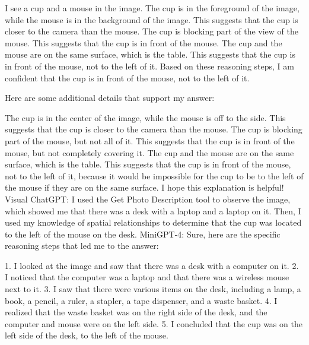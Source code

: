 \begin{enumerate}
    I see a cup and a mouse in the image.
    The cup is in the foreground of the image, while the mouse is in the background of the image. This suggests that the cup is closer to the camera than the mouse.
    The cup is blocking part of the view of the mouse. This suggests that the cup is in front of the mouse.
    The cup and the mouse are on the same surface, which is the table. This suggests that the cup is in front of the mouse, not to the left of it.
    Based on these reasoning steps, I am confident that the cup is in front of the mouse, not to the left of it.

    Here are some additional details that support my answer:

    The cup is in the center of the image, while the mouse is off to the side. This suggests that the cup is closer to the camera than the mouse.
    The cup is blocking part of the mouse, but not all of it. This suggests that the cup is in front of the mouse, but not completely covering it.
    The cup and the mouse are on the same surface, which is the table. This suggests that the cup is in front of the mouse, not to the left of it, because it would be impossible for the cup to be to the left of the mouse if they are on the same surface.
    I hope this explanation is helpful!
    \subitem Visual ChatGPT: I used the Get Photo Description tool to observe the image, which showed me that there was a desk with a laptop and a laptop on it. Then, I used my knowledge of spatial relationships to determine that the cup was located to the left of the mouse on the desk.
    \subitem MiniGPT-4: Sure, here are the specific reasoning steps that led me to the answer:

    1. I looked at the image and saw that there was a desk with a computer on it.
    2. I noticed that the computer was a laptop and that there was a wireless mouse next to it.
    3. I saw that there were various items on the desk, including a lamp, a book, a pencil, a ruler, a stapler, a tape dispenser, and a waste basket.
    4. I realized that the waste basket was on the right side of the desk, and the computer and mouse were on the left side.
    5. I concluded that the cup was on the left side of the desk, to the left of the mouse.
\end{enumerate}
